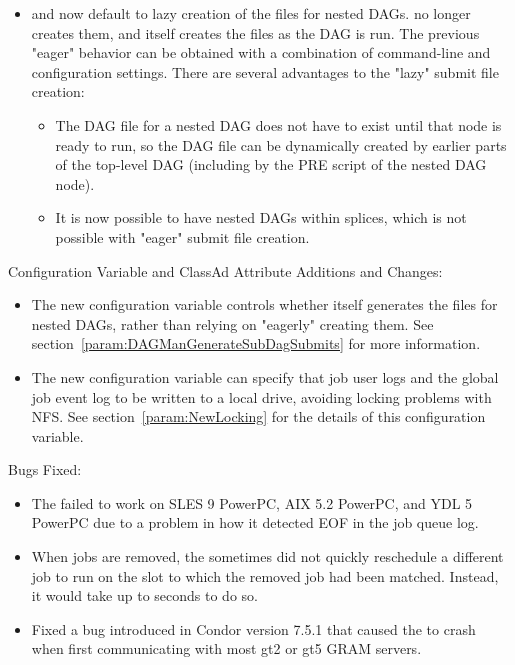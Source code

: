 \begin{itemize}
\item {} and  now default to lazy
creation  of the  files for nested DAGs.
 no longer creates them, and 
itself creates the files as the DAG is run.
The previous "eager" behavior can
be obtained with a combination of command-line and configuration settings.
There are several advantages to the "lazy" submit file creation:
\begin{itemize}
\item The DAG file for a nested DAG does not have to exist until that node
is ready to run, so the DAG file can be dynamically created by earlier
parts of the top-level DAG (including by the PRE script of the nested
DAG node).
\item It is now possible to have nested DAGs within splices, which is not
possible with "eager" submit file creation.
\end{itemize}

\end{itemize}

\noindent Configuration Variable and ClassAd Attribute Additions and Changes:

\begin{itemize}

\item The new configuration variable
 controls whether
 itself generates the  files for
nested DAGs, rather than relying on  "eagerly"
creating them.  See section~\ref{param:DAGManGenerateSubDagSubmits} for
more information.

\item The new configuration variable  can specify that
  job user logs and the global job event log to be written to a local drive,
  avoiding locking problems with NFS.
  See section~\ref{param:NewLocking} for 
  the details of this configuration variable.
\end{itemize}

\noindent Bugs Fixed:

\begin{itemize}

\item The  failed to work on SLES 9 PowerPC,
AIX 5.2 PowerPC,
and YDL 5 PowerPC due to a problem in how it detected EOF in the job queue log.

\item When jobs are removed, the  sometimes did not
  quickly reschedule a different job to run on the slot to which the
  removed job had been matched.  Instead, it would take up to
   seconds to do so.

\item Fixed a bug introduced in Condor version 7.5.1 that caused the
 to crash when
first communicating with most gt2 or gt5 GRAM servers.

\end{itemize}


